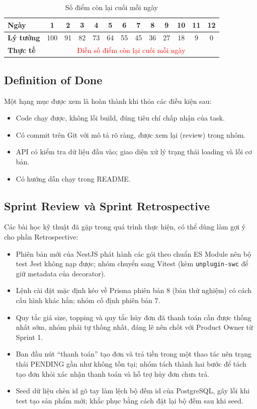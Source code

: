 \documentclass[a4paper]{article}
\begin{document}
\begin{table}[h!]
\centering
\footnotesize
\begin{tabular}{|l|c|c|c|c|c|c|c|c|c|c|c|c|}
\hline
\textbf{Ngày} & 1 & 2 & 3 & 4 & 5 & 6 & 7 & 8 & 9 & 10 & 11 & 12 \\ \hline
\textbf{Lý tưởng} & 100 & 91 & 82 & 73 & 64 & 55 & 45 & 36 & 27 & 18 & 9 & 0 \\ \hline
\textbf{Thực tế} & \multicolumn{12}{c|}{\textcolor{red}{Điền số điểm còn lại cuối mỗi ngày}} \\ \hline
\end{tabular}
\caption{Số điểm còn lại cuối mỗi ngày}
\end{table}



\subsection{Definition of Done}
Một hạng mục được xem là hoàn thành khi thỏa các điều kiện sau:
\begin{itemize}
	\item Code chạy được, không lỗi build, đúng tiêu chí chấp nhận của task.
	\item Có commit trên Git với mô tả rõ ràng, được xem lại (review) trong nhóm.
	\item API có kiểm tra dữ liệu đầu vào; giao diện xử lý trạng thái loading và lỗi cơ bản.
	\item Có hướng dẫn chạy trong README.
\end{itemize}

\subsection{Sprint Review và Sprint Retrospective}


Các bài học kỹ thuật đã gặp trong quá trình thực hiện, có thể dùng làm gợi ý cho phần Retrospective:
\begin{itemize}
	\item Phiên bản mới của NestJS phát hành các gói theo chuẩn ES Module nên bộ test Jest không nạp được; nhóm chuyển sang Vitest (kèm \texttt{unplugin-swc} để giữ metadata của decorator).
	\item Lệnh cài đặt mặc định kéo về Prisma phiên bản 8 (bản thử nghiệm) có cách cấu hình khác hẳn; nhóm cố định phiên bản 7.
	\item Quy tắc giá size, topping và quy tắc hủy đơn đã thanh toán cần được thống nhất sớm, nhóm phải tự thống nhất, đáng lẽ nên chốt với Product Owner từ Sprint 1.
	\item Ban đầu nút ``thanh toán'' tạo đơn và trả tiền trong một thao tác nên trạng thái PENDING gần như không tồn tại; nhóm tách thành hai bước để tách tạo đơn khỏi xác nhận thanh toán và hỗ trợ hủy đơn chưa trả.
	\item Seed dữ liệu chèn id gõ tay làm lệch bộ đếm id của PostgreSQL, gây lỗi khi test tạo sản phẩm mới; khắc phục bằng cách đặt lại bộ đếm sau khi seed.
\end{itemize}
\end{document}
